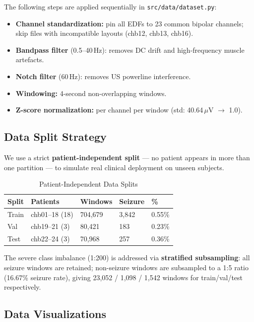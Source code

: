 \documentclass[11pt,twocolumn]{article}
\begin{document}
The following steps are applied sequentially in \texttt{src/data/dataset.py}:
\begin{itemize}
  \item \textbf{Channel standardization:} pin all EDFs to 23 common bipolar
        channels; skip files with incompatible layouts (chb12, chb13, chb16).
  \item \textbf{Bandpass filter} (0.5--40\,Hz): removes DC drift and
        high-frequency muscle artefacts.
  \item \textbf{Notch filter} (60\,Hz): removes US powerline interference.
  \item \textbf{Windowing:} 4-second non-overlapping windows.
  \item \textbf{Z-score normalization:} per channel per window
        (std: 40.64\,$\mu$V $\to$ 1.0).
\end{itemize}

\subsection{Data Split Strategy}

We use a strict \textbf{patient-independent split} — no patient appears in
more than one partition — to simulate real clinical deployment on unseen
subjects.

\begin{table}[h]
\centering
\caption{Patient-Independent Data Splits}
\small
\begin{tabular}{@{}lllll@{}}
\toprule
\textbf{Split} & \textbf{Patients} & \textbf{Windows} &
\textbf{Seizure} & \textbf{\%} \\
\midrule
Train & chb01--18 (18) & 704,679 & 3,842 & 0.55\% \\
Val   & chb19--21 (3)  & 80,421  & 183   & 0.23\% \\
Test  & chb22--24 (3)  & 70,968  & 257   & 0.36\% \\
\bottomrule
\end{tabular}
\label{tab:splits}
\end{table}

The severe class imbalance (1:200) is addressed via \textbf{stratified
subsampling}: all seizure windows are retained; non-seizure windows are
subsampled to a 1:5 ratio (16.67\% seizure rate), giving 23,052 / 1,098 /
1,542 windows for train/val/test respectively.

\subsection{Data Visualizations}
\end{document}
